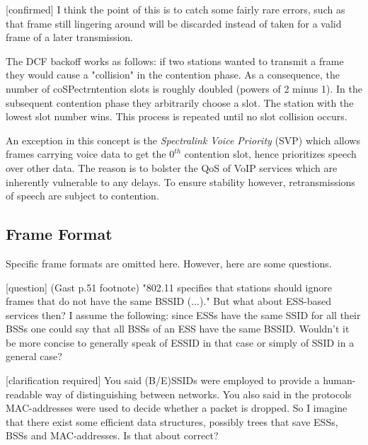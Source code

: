 \documentclass{article}
\begin{document}
	\medskip
	
	\color{red}
	[confirmed] I think the point of this is to catch some fairly rare errors, such as that frame still lingering around will be discarded instead of taken for a valid frame of a later transmission.
	\color{black}
	
	\bigskip
	
	The DCF backoff works as follows: if two stations wanted to transmit a frame they would cause a "collision" in the contention phase. As a consequence, the number of coSPectrntention slots is roughly doubled (powers of 2 minus 1). In the subsequent contention phase they arbitrarily choose a slot. The station with the lowest slot number wins. This process is repeated until no slot collision occurs.
	
	\bigskip
	
	An exception in this concept is the \emph{Spectralink Voice Priority} (SVP) which allows frames carrying voice data to get the $0^{th}$ contention slot, hence prioritizes speech over other data. The reason is to bolster the QoS of VoIP services which are inherently vulnerable to any delays. To ensure stability however, retransmissions of speech are subject to contention.
	
	\subsection{Frame Format}
	
	Specific frame formats are omitted here. However, here are some questions.
	
	\bigskip
	
	\color{blue}
	[question] (Gast p.51 footnote) "802.11 specifies that stations should ignore frames that do not have the same BSSID (...)." But what about ESS-based services then? I assume the following: since ESSs have the same SSID for all their BSSs one could say that all BSSs of an ESS have the same BSSID. Wouldn't it be more concise to generally speak of ESSID in that case or simply of SSID in a general case?
	\color{black}
	
	\bigskip
	
	\color{orange}
	[clarification required] You said (B/E)SSIDs were employed to provide a human-readable way of distinguishing between networks. You also said in the protocols MAC-addresses were used to decide whether a packet is dropped. So I imagine that there exist some efficient data structures, possibly trees that save ESSs, BSSs and MAC-addresses. Is that about correct?
	\color{black}
	
\end{document}

